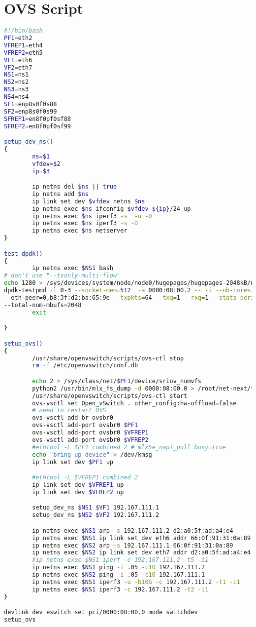 
\section{OVS Script} \label{sec:bash_script}
\begin{lstlisting}[language=sh, caption={Bash Script for Database Backup}, label={lst:bash_script}]
#!/bin/bash
PF1=eth2
VFREP1=eth4
VFREP2=eth5
VF1=eth6
VF2=eth7
NS1=ns1
NS2=ns2
NS3=ns3
NS4=ns4
SF1=enp8s0f0s88
SF2=enp8s0f0s99
SFREP1=en8f0pf0sf88
SFREP2=en8f0pf0sf99

setup_dev_ns()
{
        ns=$1
        vfdev=$2
        ip=$3

        ip netns del $ns || true
        ip netns add $ns
        ip link set dev $vfdev netns $ns
        ip netns exec $ns ifconfig $vfdev ${ip}/24 up
        ip netns exec $ns iperf3 -s  -u -D
        ip netns exec $ns iperf3 -s -D
        ip netns exec $ns netserver
}

test_dpdk()
{
        ip netns exec $NS1 bash
# don't use "--txonly-multi-flow"
echo 1280 > /sys/devices/system/node/node0/hugepages/hugepages-2048kB/nr_hugepages
dpdk-testpmd -l 0-3 --socket-mem=512  -a 0000:08:00.2 -- -i --nb-cores=1 --forward-mode=txonly \
--eth-peer=0,b8:3f:d2:ba:65:9e --txpkts=64 --txq=1 --rxq=1 --stats-period=1 --txonly-multi-flow \
--total-num-mbufs=2048
        exit

}

setup_ovs()
{
        /usr/share/openvswitch/scripts/ovs-ctl stop
        rm -f /etc/openvswitch/conf.db

        echo 2 > /sys/class/net/$PF1/device/sriov_numvfs
        python2 /usr/bin/mlx_fs_dump -d 0000:08:00.0 > /root/net-next/fdb.txt
        /usr/share/openvswitch/scripts/ovs-ctl start
        ovs-vsctl set Open_vSwitch . other_config:hw-offload=false 
        # need to restart OVS
        ovs-vsctl add-br ovsbr0
        ovs-vsctl add-port ovsbr0 $PF1
        ovs-vsctl add-port ovsbr0 $VFREP1
        ovs-vsctl add-port ovsbr0 $VFREP2
        #ethtool -L $PF1 combined 2 # mlx5e_napi_poll busy=true
        echo "bring up device" > /dev/kmsg
        ip link set dev $PF1 up

        #ethtool -L $VFREP1 combined 2
        ip link set dev $VFREP1 up
        ip link set dev $VFREP2 up

        setup_dev_ns $NS1 $VF1 192.167.111.1
        setup_dev_ns $NS2 $VF2 192.167.111.2

        ip netns exec $NS1 arp -s 192.167.111.2 d2:a0:5f:ad:a4:e4
        ip netns exec $NS1 ip link set dev eth6 addr 66:0f:91:31:0a:89
        ip netns exec $NS2 arp -s 192.167.111.1 66:0f:91:31:0a:89
        ip netns exec $NS2 ip link set dev eth7 addr d2:a0:5f:ad:a4:e4
        #ip netns exec $NS1 iperf -c 192.167.111.2 -t5 -i1
        ip netns exec $NS1 ping -i .05 -c10 192.167.111.2
        ip netns exec $NS2 ping -i .05 -c10 192.167.111.1
        ip netns exec $NS1 iperf3 -u -b10G -c 192.167.111.2 -t1 -i1
        ip netns exec $NS1 iperf3 -c 192.167.111.2 -t2 -i1
}

devlink dev eswitch set pci/0000:08:00.0 mode switchdev
setup_ovs
\end{lstlisting}
